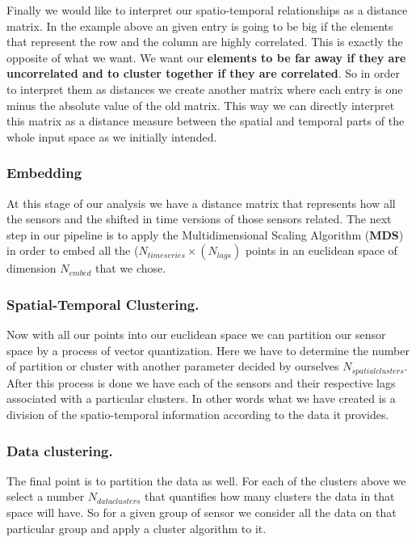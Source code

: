 \documentclass[11pt,a4paper]{article}
\begin{document}
Finally we would like to interpret our spatio-temporal relationships as
a distance matrix. In the example above an given entry is going to be
big if the elements that represent the row and the column are highly
correlated. This is exactly the opposite of what we want. We want our
\textbf{elements to be far away if they are uncorrelated and to cluster
together if they are correlated}. So in order to interpret them as
distances we create another matrix where each entry is one minus the
absolute value of the old matrix. This way we can directly interpret
this matrix as a distance measure between the spatial and temporal parts
of the whole input space as we initially intended.

\subsubsection{Embedding}\label{embedding}

At this stage of our analysis we have a distance matrix that represents
how all the sensors and the shifted in time versions of those sensors
related. The next step in our pipeline is to apply the Multidimensional
Scaling Algorithm (\textbf{MDS}) in order to embed all the ($N_{time
series} \times (N_{lags})$ points in an euclidean space of dimension
\(N_{embed}\) that we chose.

\subsubsection{Spatial-Temporal
Clustering.}\label{spatial-temporal-clustering.}

Now with all our points into our euclidean space we can partition our
sensor space by a process of vector quantization. Here we have to
determine the number of partition or cluster with another parameter
decided by ourselves \(N_{spatial clusters}\). After this process is
done we have each of the sensors and their respective lags associated
with a particular clusters. In other words what we have created is a
division of the spatio-temporal information according to the data it
provides.

\subsubsection{Data clustering.}\label{data-clustering.}

The final point is to partition the data as well. For each of the
clusters above we select a number \(N_{data clusters}\) that quantifies
how many clusters the data in that space will have. So for a given group
of sensor we consider all the data on that particular group and apply a
cluster algorithm to it.
\end{document}
